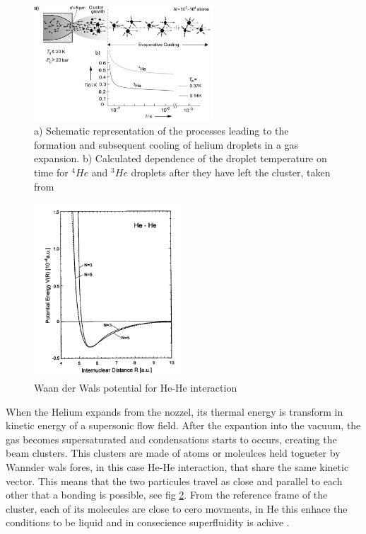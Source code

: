 \begin{figure}[h!]
\centering
	\includegraphics[width=0.6\textwidth]{../Images/jet_scketch.png}
	\caption[Scheme for a nozzle expansion]{ a) Schematic representation of the processes leading to the formation and subsequent cooling of helium droplets in a gas expansion. b) Calculated dependence of the droplet temperature on time for $^{4}He$ and $^{3}He$ droplets after they have left the cluster, taken from \cite{toennies_superfluid_2004}	}
	\label{img:jet}	
\end{figure}

\begin{figure}[h!]
\centering
	\includegraphics[width=0.5\textwidth]{../Images/waanderwaal_hehe.PNG}
	\caption[Waan der Wall He-He potential]{ Waan der Wals potential for He-He interaction}
	\label{img:WanderHe}
\end{figure}


When the Helium expands from the nozzel, its thermal energy is transform in kinetic energy of a supersonic flow field. After the expantion into the vacuum, the gas becomes supersaturated and condensations starts to occurs, creating the beam clusters. This clusters are made of atoms or moleulces held togueter by Wannder wals fores, in this case He-He interaction, that share the same kinetic vector. This means that the two particules travel as close and parallel to each other that a bonding is possible, see fig \ref{img:WanderHe}. From the reference frame of the cluster, each of its molecules are close to cero movments, in He this enhace the conditions to be liquid and in consecience superfluidity is achive  \cite{hagena_cluster_1972}.
 
